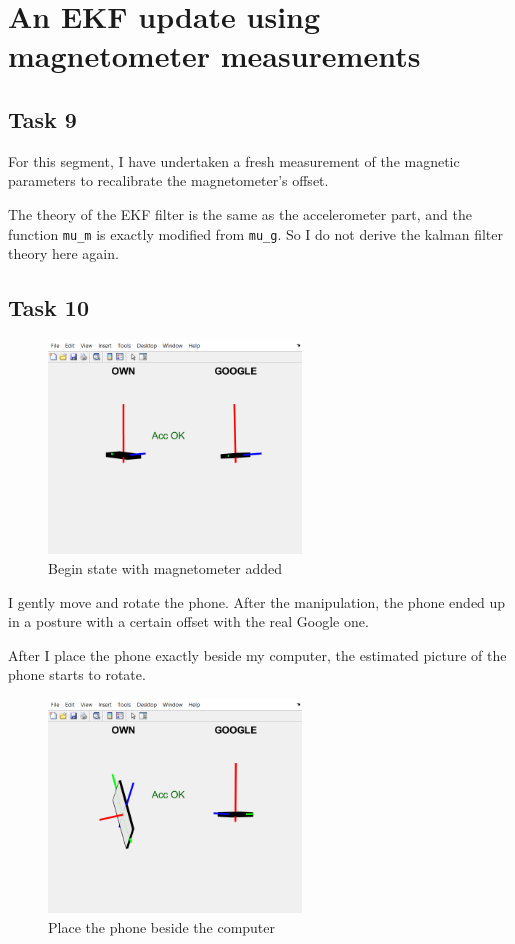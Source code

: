 \section{An EKF update using magnetometer measurements}

\subsection{Task 9}

For this segment, I have undertaken a fresh measurement of the magnetic parameters to recalibrate the magnetometer's offset.

The theory of the EKF filter is the same as the accelerometer part, and the function  \texttt{mu\_m} is exactly modified from \texttt{mu\_g}. So I do not derive the kalman filter theory here again.

\subsection{Task 10}

\begin{figure}[H]
 \centering
 \includegraphics[width=0.6\textwidth]{images/magbegin.png}
 \caption{Begin state with magnetometer added}
 \label{magbegin}
\end{figure}

I gently move and rotate the phone. After the manipulation, the phone ended up in a posture with a certain offset with the real Google one.

After I place the phone exactly beside my computer, the estimated picture of the phone starts to rotate.


\begin{figure}[H]
 \centering
 \includegraphics[width=0.6\textwidth]{images/rotatebesidecomputer.png}
 \caption{Place the phone beside the computer}
 \label{rotatemag}
\end{figure}


